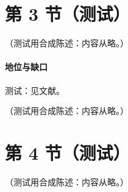 \section{第 3 节（测试）}\label{sec:smallx-kt}

\begin{conjecture}\label{conj:smallx-saturation}
（测试用合成陈述：内容从略。）
\end{conjecture}
\paragraph{地位与缺口}测试：见文献。

\begin{remark}\label{rem:smallx-nonuniform}
（测试用合成陈述：内容从略。）
\end{remark}

\section{第 4 节（测试）}\label{sec:smallx-dipole}

\begin{example}\label{ex:smallx-dla}
（测试用合成陈述：内容从略。）
\end{example}

